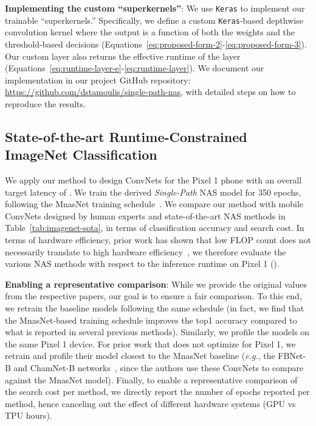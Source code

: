 \documentclass[runningheads]{llncs}
\begin{document}
\textbf{Implementing the custom ``superkernels''}: We use \texttt{Keras} 
to implement our trainable ``superkernels.'' Specifically, we define a custom
\texttt{Keras}-based depthwise convolution kernel where the output is a function
of both the weights and the threshold-based decisions 
(Equations~\ref{eq:proposed-form-2}-\ref{eq:proposed-form-3}). Our custom 
layer also returns the effective runtime of the layer 
(Equations~\ref{eq:runtime-layer-e}-\ref{eq:runtime-layer}). 
We document our implementation in our project GitHub 
repository: \url{https://github.com/dstamoulis/single-path-nas},
with detailed steps on how to reproduce the results.  


\subsection{State-of-the-art Runtime-Constrained ImageNet Classification}

We apply our method to design ConvNets for the Pixel 1 phone
with an overall target latency of . We train the derived \textit{Single-Path} 
NAS model for 350 epochs, following the MnasNet 
training schedule~\cite{tan2018mnasnet}. We compare our method with
mobile ConvNets designed by human experts and state-of-the-art 
NAS methods in Table~\ref{tab:imagenet-sota}, in terms of classification 
accuracy and search cost. In terms of hardware efficiency, prior work has 
shown that low FLOP count does 
not necessarily translate to high hardware efficiency~\cite{dong2018dpp}, 
we therefore evaluate the various NAS methods with respect to the inference
runtime on Pixel 1 (). 


\textbf{Enabling a representative comparison}:
While we provide the original values from the 
respective papers, our goal is to ensure a fair comparison. 
To this end, we retrain the baseline models following the same 
schedule (in fact, we find that the MnasNet-based training schedule 
improves the top1 accuracy compared to what is reported in several previous 
methods). Similarly, we profile the models on the same Pixel 1 device.
For prior work that does not optimize for Pixel 1, we retrain and profile their 
model closest to the MnasNet baseline (\textit{e.g.}, the FBNet-B and ChamNet-B 
networks~\cite{dai2018chamnet,wu2018fbnet}, since the authors use these
ConvNets to compare against the MnasNet model). Finally, to enable a representative 
comparison of the search cost per method, we directly report 
the number of epochs reported per method, hence canceling out the 
effect of different hardware systems (GPU vs TPU hours).
\end{document}
